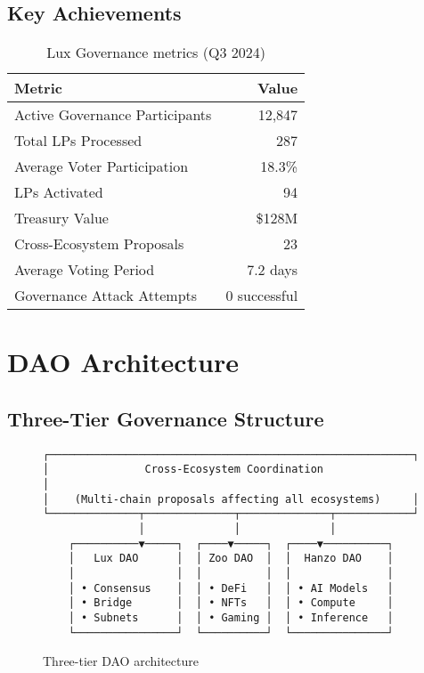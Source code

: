 \documentclass[11pt,a4paper]{article}
\begin{document}
\subsection{Key Achievements}

\begin{table}[h]
\centering
\begin{tabular}{@{}lr@{}}
\toprule
\textbf{Metric} & \textbf{Value} \\ \midrule
Active Governance Participants & 12,847 \\
Total LPs Processed & 287 \\
Average Voter Participation & 18.3\% \\
LPs Activated & 94 \\
Treasury Value & \$128M \\
Cross-Ecosystem Proposals & 23 \\
Average Voting Period & 7.2 days \\
Governance Attack Attempts & 0 successful \\ \bottomrule
\end{tabular}
\caption{Lux Governance metrics (Q3 2024)}
\end{table}

\section{DAO Architecture}

\subsection{Three-Tier Governance Structure}

\begin{figure}[h]
\centering
\begin{verbatim}
┌─────────────────────────────────────────────────────────┐
│               Cross-Ecosystem Coordination               │
│    (Multi-chain proposals affecting all ecosystems)     │
└──────────────┬──────────────┬──────────────┬────────────┘
               │              │              │
    ┌──────────▼─────┐  ┌────▼─────┐  ┌────▼──────────┐
    │   Lux DAO      │  │ Zoo DAO  │  │  Hanzo DAO    │
    │                │  │          │  │               │
    │ • Consensus    │  │ • DeFi   │  │ • AI Models   │
    │ • Bridge       │  │ • NFTs   │  │ • Compute     │
    │ • Subnets      │  │ • Gaming │  │ • Inference   │
    └────────────────┘  └──────────┘  └───────────────┘
\end{verbatim}
\caption{Three-tier DAO architecture}
\end{figure}
\end{document}
